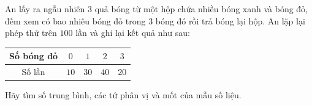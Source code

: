 \begin{ex}
An lấy ra ngẫu nhiên $3$ quả bóng từ một hộp chứa nhiều bóng xanh và bóng đỏ, đếm xem có bao nhiêu bóng đỏ trong $3$ bóng đó rồi trả bóng lại hộp. An lặp lại phép thử trên $100$ lần và ghi lại kết quả như sau:
\begin{center}
\begin{tabular}{|c|c|c|c|c|}\hline
Số bóng đỏ & $0$ & $1$ & $2$ & $3$\\\hline
Số lần & $10$ & $30$ & $40$ & $20$\\\hline
\end{tabular}
\end{center}
Hãy tìm số trung bình, các tứ phân vị và mốt của mẫu số liệu.
\end{ex}
